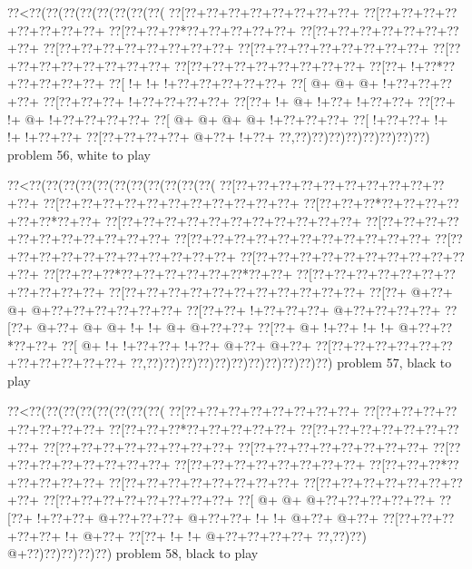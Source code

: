\vbox{\vbox{\goo
\0??<\0??(\0??(\0??(\0??(\0??(\0??(\0??(\0??(
\0??[\0??+\0??+\0??+\0??+\0??+\0??+\0??+\0??+
\0??[\0??+\0??+\0??+\0??+\0??+\0??+\0??+\0??+
\0??[\0??+\0??+\0??*\0??+\0??+\0??+\0??+\0??+
\0??[\0??+\0??+\0??+\0??+\0??+\0??+\0??+\0??+
\0??[\0??+\0??+\0??+\0??+\0??+\0??+\0??+\0??+
\0??[\0??+\0??+\0??+\0??+\0??+\0??+\0??+\0??+
\0??[\0??+\0??+\0??+\0??+\0??+\0??+\0??+\0??+
\0??[\0??+\0??+\0??+\0??+\0??+\0??+\0??+\0??+
\0??[\0??+\- !+\0??*\0??+\0??+\0??+\0??+\0??+
\0??[\- !+\- !+\- !+\0??+\0??+\0??+\0??+\0??+
\0??[\- @+\- @+\- @+\- !+\0??+\0??+\0??+\0??+
\0??[\0??+\0??+\0??+\- !+\0??+\0??+\0??+\0??+
\0??[\0??+\- !+\- @+\- !+\0??+\- !+\0??+\0??+
\0??[\0??+\- !+\- @+\- !+\0??+\0??+\0??+\0??+
\0??[\- @+\- @+\- @+\- @+\- !+\0??+\0??+\0??+
\0??[\- !+\0??+\0??+\- !+\- !+\- !+\0??+\0??+
\0??[\0??+\0??+\0??+\0??+\- @+\0??+\- !+\0??+
\0??,\0??)\0??)\0??)\0??)\0??)\0??)\0??)\0??)
}
\hfil problem 56, white to play\hfil\break
}

\vbox{\vbox{\goo
\0??<\0??(\0??(\0??(\0??(\0??(\0??(\0??(\0??(\0??(\0??(\0??(
\0??[\0??+\0??+\0??+\0??+\0??+\0??+\0??+\0??+\0??+\0??+\0??+
\0??[\0??+\0??+\0??+\0??+\0??+\0??+\0??+\0??+\0??+\0??+\0??+
\0??[\0??+\0??+\0??*\0??+\0??+\0??+\0??+\0??+\0??*\0??+\0??+
\0??[\0??+\0??+\0??+\0??+\0??+\0??+\0??+\0??+\0??+\0??+\0??+
\0??[\0??+\0??+\0??+\0??+\0??+\0??+\0??+\0??+\0??+\0??+\0??+
\0??[\0??+\0??+\0??+\0??+\0??+\0??+\0??+\0??+\0??+\0??+\0??+
\0??[\0??+\0??+\0??+\0??+\0??+\0??+\0??+\0??+\0??+\0??+\0??+
\0??[\0??+\0??+\0??+\0??+\0??+\0??+\0??+\0??+\0??+\0??+\0??+
\0??[\0??+\0??+\0??*\0??+\0??+\0??+\0??+\0??+\0??*\0??+\0??+
\0??[\0??+\0??+\0??+\0??+\0??+\0??+\0??+\0??+\0??+\0??+\0??+
\0??[\0??+\0??+\0??+\0??+\0??+\0??+\0??+\0??+\0??+\0??+\0??+
\0??[\0??+\- @+\0??+\- @+\- @+\0??+\0??+\0??+\0??+\0??+\0??+
\0??[\0??+\0??+\- !+\0??+\0??+\0??+\- @+\0??+\0??+\0??+\0??+
\0??[\0??+\- @+\0??+\- @+\- @+\- !+\- !+\- @+\- @+\0??+\0??+
\0??[\0??+\- @+\- !+\0??+\- !+\- !+\- @+\0??+\0??*\0??+\0??+
\0??[\- @+\- !+\- !+\0??+\0??+\- !+\0??+\- @+\0??+\- @+\0??+
\0??[\0??+\0??+\0??+\0??+\0??+\0??+\0??+\0??+\0??+\0??+\0??+
\0??,\0??)\0??)\0??)\0??)\0??)\0??)\0??)\0??)\0??)\0??)\0??)
}
\hfil problem 57, black to play\hfil\break
}

\vbox{\vbox{\goo
\0??<\0??(\0??(\0??(\0??(\0??(\0??(\0??(\0??(
\0??[\0??+\0??+\0??+\0??+\0??+\0??+\0??+\0??+
\0??[\0??+\0??+\0??+\0??+\0??+\0??+\0??+\0??+
\0??[\0??+\0??+\0??*\0??+\0??+\0??+\0??+\0??+
\0??[\0??+\0??+\0??+\0??+\0??+\0??+\0??+\0??+
\0??[\0??+\0??+\0??+\0??+\0??+\0??+\0??+\0??+
\0??[\0??+\0??+\0??+\0??+\0??+\0??+\0??+\0??+
\0??[\0??+\0??+\0??+\0??+\0??+\0??+\0??+\0??+
\0??[\0??+\0??+\0??+\0??+\0??+\0??+\0??+\0??+
\0??[\0??+\0??+\0??*\0??+\0??+\0??+\0??+\0??+
\0??[\0??+\0??+\0??+\0??+\0??+\0??+\0??+\0??+
\0??[\0??+\0??+\0??+\0??+\0??+\0??+\0??+\0??+
\0??[\0??+\0??+\0??+\0??+\0??+\0??+\0??+\0??+
\0??[\- @+\- @+\- @+\0??+\0??+\0??+\0??+\0??+
\0??[\0??+\- !+\0??+\0??+\- @+\0??+\0??+\0??+
\- @+\0??+\0??+\- !+\- !+\- @+\0??+\- @+\0??+
\0??[\0??+\0??+\0??+\0??+\0??+\- !+\- @+\0??+
\0??[\0??+\- !+\- !+\- @+\0??+\0??+\0??+\0??+
\0??,\0??)\0??)\- @+\0??)\0??)\0??)\0??)\0??)
}
\hfil problem 58, black to play\hfil\break
}


